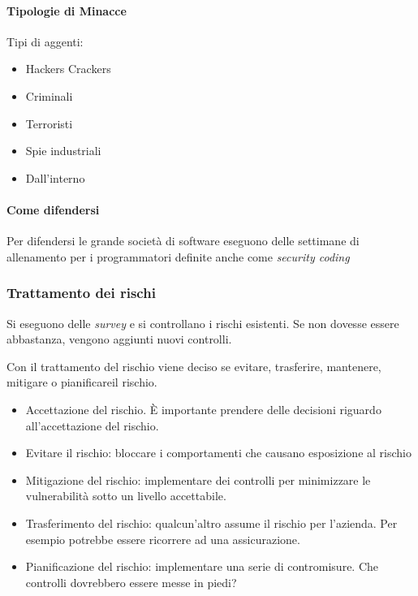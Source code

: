\paragraph*{Tipologie di Minacce}

Tipi di aggenti:
\begin{itemize}
\item Hackers Crackers
\item Criminali
\item Terroristi
\item Spie industriali
\item Dall'interno
\end{itemize}


\paragraph*{Come difendersi}

Per difendersi le grande società di software eseguono delle settimane di
allenamento per i programmatori definite anche come \textit{security coding}



\subsubsection{Trattamento dei rischi}

Si eseguono delle \textit{survey} e si controllano i rischi esistenti. Se non
dovesse essere abbastanza, vengono aggiunti nuovi controlli.

Con il trattamento del rischio viene deciso se evitare, trasferire, mantenere,
mitigare o pianificareil rischio.

\begin{itemize}
\item Accettazione del rischio. È importante prendere delle decisioni riguardo
all'accettazione del rischio.
\item Evitare il rischio: bloccare i comportamenti che causano esposizione al
rischio
\item Mitigazione del rischio: implementare dei controlli per minimizzare le
vulnerabilità sotto un livello accettabile.
\item Trasferimento del rischio: qualcun'altro assume il rischio per l'azienda.
Per esempio potrebbe essere ricorrere ad una assicurazione.
\item Pianificazione del rischio: implementare una serie di contromisure. Che
controlli dovrebbero essere messe in piedi?
\end{itemize}

